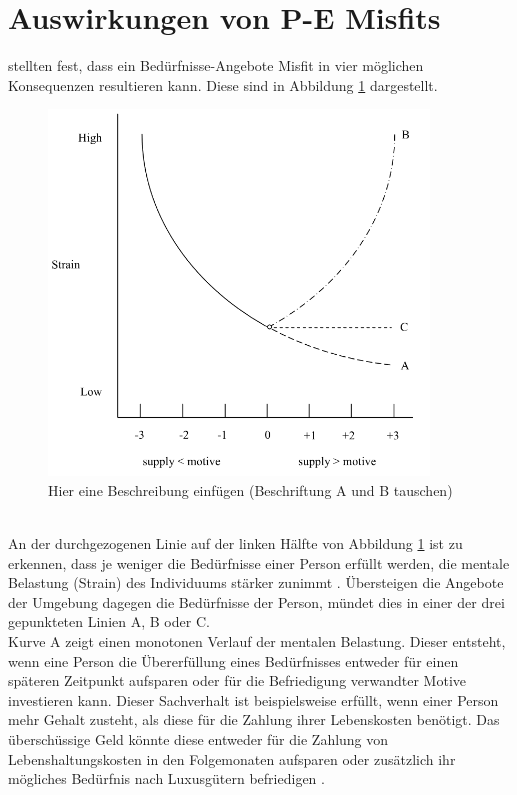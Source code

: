 \section{Auswirkungen von P-E Misfits}
\label{ch:personEnvironmentFit:auswirkungenErhoehterAngebote}
\textcite{mechanismsOfJobStressAndStrain:1982} stellten fest, dass ein Bedürfnisse-Angebote Misfit in vier möglichen Konsequenzen resultieren kann. Diese sind in Abbildung \ref{fig:personEnvironmentFit:auswirkungenErhoehterAngebote:abb1} dargestellt.\\
\begin{figure}[h]
	\centering
	\includegraphics[width=0.9\textwidth]{gfx/ueberschuss_supply_motive.png}
	\caption{Hier eine Beschreibung einfügen (Beschriftung A und B tauschen) \cite[S. 23]{edwards:2008}}
	\label{fig:personEnvironmentFit:auswirkungenErhoehterAngebote:abb1}
\end{figure}\\
An der durchgezogenen Linie auf der linken Hälfte von Abbildung \ref{fig:personEnvironmentFit:auswirkungenErhoehterAngebote:abb1} ist zu erkennen, dass je weniger die Bedürfnisse einer Person erfüllt werden, die mentale Belastung (Strain) des Individuums stärker zunimmt \cite{mechanismsOfJobStressAndStrain:1982}. Übersteigen die Angebote der Umgebung dagegen die Bedürfnisse der Person, mündet dies in einer der drei gepunkteten Linien A, B oder C.\\
Kurve A zeigt einen monotonen Verlauf der mentalen Belastung. Dieser entsteht, wenn eine Person die Übererfüllung eines Bedürfnisses entweder für einen späteren Zeitpunkt aufsparen oder für die Befriedigung verwandter Motive investieren kann. Dieser Sachverhalt ist beispielsweise erfüllt, wenn einer Person mehr Gehalt zusteht, als diese für die Zahlung ihrer Lebenskosten benötigt. Das überschüssige Geld könnte diese entweder für die Zahlung von Lebenshaltungskosten in den Folgemonaten aufsparen oder zusätzlich ihr mögliches Bedürfnis nach Luxusgütern befriedigen \cite[S. 21]{edwards:2008}.\\
